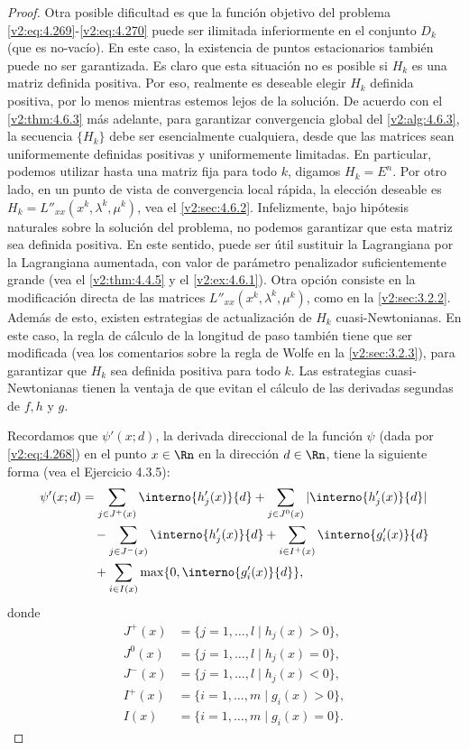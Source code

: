 \begin{proof}
Otra posible dificultad es que la función objetivo del problema \eqref{v2:eq:4.269}-\eqref{v2:eq:4.270} puede ser ilimitada inferiormente en el conjunto $D_k$ (que es no-vacío). En este caso, la existencia de puntos estacionarios también puede no ser garantizada. Es claro que esta situación no es posible si $H_k$ es una matriz definida positiva. Por eso, realmente es deseable elegir $H_k$ definida positiva, por lo menos mientras estemos lejos de la solución. De acuerdo con el \cref{v2:thm:4.6.3} más adelante, para garantizar convergencia global del \cref{v2:alg:4.6.3}, la secuencia $\{H_k\}$ debe ser esencialmente cualquiera, desde que las matrices sean uniformemente definidas positivas y uniformemente limitadas. En particular, podemos utilizar hasta una matriz fija para todo $k$, digamos $H_k = E^n$. Por otro lado, en un punto de vista de convergencia local rápida, la elección deseable es $H_k = L''_{xx}(x^k, \lambda^k, \mu^k)$, vea el \cref{v2:sec:4.6.2}. Infelizmente, bajo hipótesis naturales sobre la solución del problema, no podemos garantizar que esta matriz sea definida positiva. En este sentido, puede ser útil sustituir la Lagrangiana por la Lagrangiana aumentada, con valor de parámetro penalizador suficientemente grande (vea el \cref{v2:thm:4.4.5} y el \cref{v2:ex:4.6.1}). Otra opción consiste en la modificación directa de las matrices $L''_{xx}(x^k, \lambda^k, \mu^k)$, como en la \cref{v2:sec:3.2.2}. Además de esto, existen estrategias de actualización de $H_k$ cuasi-Newtonianas. En este caso, la regla de cálculo de la longitud de paso también tiene que ser modificada (vea los comentarios sobre la regla de Wolfe en la \cref{v2:sec:3.2.3}), para garantizar que $H_k$ sea definida positiva para todo $k$. Las estrategias cuasi-Newtonianas tienen la ventaja de que evitan el cálculo de las derivadas segundas de $f, h$ y $g$.

Recordamos que $\psi'(x; d)$, la derivada direccional de la función $\psi$ (dada por \eqref{v2:eq:4.268}) en el punto $x \in \Rn$ en la dirección $d \in \Rn$, tiene la siguiente forma (vea el Ejercicio 4.3.5):
\begin{align*}
\psi'(x; d) &= \sum_{j \in J^+(x)} \interno{h'_j(x)}{d} + \sum_{j \in J^0(x)} |\interno{h'_j(x)}{d}| \\
&\quad - \sum_{j \in J^-(x)} \interno{h'_j(x)}{d} + \sum_{i \in I^+(x)} \interno{g'_i(x)}{d} \\
&\quad + \sum_{i \in I(x)} \max\{0, \interno{g'_i(x)}{d}\},
\end{align*}
donde
\begin{align*}
J^+(x) &= \{ j = 1, \dots, l \mid h_j(x) > 0 \}, \\
J^0(x) &= \{ j = 1, \dots, l \mid h_j(x) = 0 \}, \\
J^-(x) &= \{ j = 1, \dots, l \mid h_j(x) < 0 \}, \\
I^+(x) &= \{ i = 1, \dots, m \mid g_i(x) > 0 \}, \\
I(x)   &= \{ i = 1, \dots, m \mid g_i(x) = 0 \}.
\end{align*}


\end{proof}
